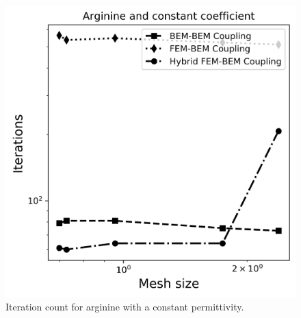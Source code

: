 \begin{figure}
\centering
  \includegraphics[width=0.6\linewidth]{Arginine_const_coeff_iter.png}
\caption{Iteration count for arginine with a constant permittivity. %
}
\label{fig:arg_contant_iter}
\end{figure}


